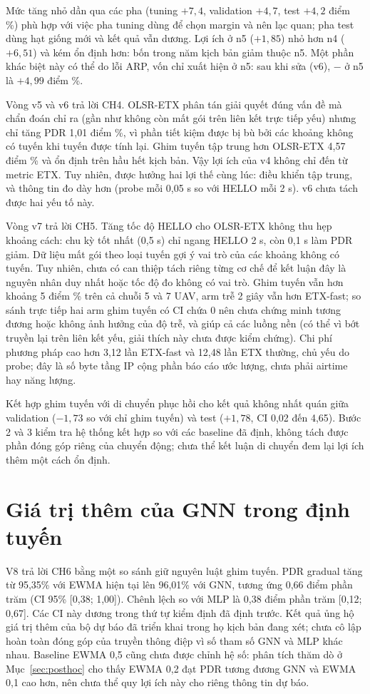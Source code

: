\documentclass[12pt,a4paper]{report}
\newcommand{\code}[1]{\texttt{\detokenize{#1}}}
\begin{document}
Mức tăng nhỏ dần qua các pha (tuning $+7{,}4$, validation $+4{,}7$, test $+4{,}2$ điểm \%) phù hợp với việc pha tuning dùng để chọn margin và nên lạc quan; pha test dùng hạt giống mới và kết quả vẫn dương. Lợi ích ở n5 ($+1{,}85$) nhỏ hơn n4 ($+6{,}51$) và kém ổn định hơn: bốn trong năm kịch bản giảm thuộc n5. Một phần khác biệt này có thể do lỗi ARP, vốn chỉ xuất hiện ở n5: sau khi sửa (v6), \code{lq-route} $-$ \code{hold} ở n5 là $+4{,}99$ điểm \%.

Vòng v5 và v6 trả lời CH4. OLSR-ETX phân tán giải quyết đúng vấn đề mà chẩn đoán chỉ ra (gần như không còn mất gói trên liên kết trực tiếp yếu) nhưng chỉ tăng PDR 1,01 điểm \%, vì phần tiết kiệm được bị bù bởi các khoảng không có tuyến khi tuyến được tính lại. Ghim tuyến tập trung hơn OLSR-ETX 4,57 điểm \% và ổn định trên hầu hết kịch bản. Vậy lợi ích của v4 không chỉ đến từ metric ETX. Tuy nhiên, \code{lq-route} được hưởng hai lợi thế cùng lúc: điều khiển tập trung, và thông tin đo dày hơn (probe mỗi 0,05 s so với HELLO mỗi 2 s). v6 chưa tách được hai yếu tố này.

Vòng v7 trả lời CH5. Tăng tốc độ HELLO cho OLSR-ETX không thu hẹp khoảng cách: chu kỳ tốt nhất (0,5 s) chỉ ngang HELLO 2 s, còn 0,1 s làm PDR giảm. Dữ liệu mất gói theo loại tuyến gợi ý vai trò của các khoảng không có tuyến. Tuy nhiên, chưa có can thiệp tách riêng từng cơ chế để kết luận đây là nguyên nhân duy nhất hoặc tốc độ đo không có vai trò. Ghim tuyến vẫn hơn khoảng 5 điểm \% trên cả chuỗi 5 và 7 UAV, arm trễ 2 giây vẫn hơn ETX-fast; so sánh trực tiếp hai arm ghim tuyến có CI chứa 0 nên chưa chứng minh tương đương hoặc không ảnh hưởng của độ trễ, và giúp cả các luồng nền (có thể vì bớt truyền lại trên liên kết yếu, giải thích này chưa được kiểm chứng). Chi phí phương pháp cao hơn 3,12 lần ETX-fast và 12,48 lần ETX thường, chủ yếu do probe; đây là số byte tầng IP cộng phần báo cáo ước lượng, chưa phải airtime hay năng lượng.

Kết hợp ghim tuyến với di chuyển phục hồi cho kết quả không nhất quán giữa validation ($-1{,}73$ so với chỉ ghim tuyến) và test ($+1{,}78$, CI 0,02 đến 4,65). Bước 2 và 3 kiểm tra hệ thống kết hợp so với các baseline đã định, không tách được phần đóng góp riêng của chuyển động; chưa thể kết luận di chuyển đem lại lợi ích thêm một cách ổn định.

\section{Giá trị thêm của GNN trong định tuyến}
V8 trả lời CH6 bằng một so sánh giữ nguyên luật ghim tuyến. PDR gradual tăng
từ 95,35\% với EWMA hiện tại lên 96,01\% với GNN, tương ứng 0,66 điểm phần
trăm (CI 95\% [0,38; 1,00]). Chênh lệch so với MLP là 0,38 điểm phần trăm
[0,12; 0,67]. Các CI này dương trong thứ tự kiểm định đã định trước. Kết quả
ủng hộ giá trị thêm của bộ dự báo đã triển khai trong họ kịch bản đang xét;
chưa cô lập hoàn toàn đóng góp của truyền thông điệp vì số tham số GNN và MLP
khác nhau. Baseline EWMA 0,5 cũng chưa được chỉnh hệ số: phân tích thăm dò ở
Mục~\ref{sec:posthoc} cho thấy EWMA 0,2 đạt PDR tương đương GNN và EWMA 0,1
cao hơn, nên chưa thể quy lợi ích này cho riêng thông tin dự báo.
\end{document}
